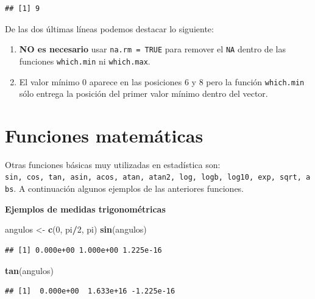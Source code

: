 \documentclass[10pt,]{krantz}
\makeatletter
\newenvironment{Shaded}{\begin{snugshade}}{\end{snugshade}}
\newcommand{\KeywordTok}[1]{\textcolor[rgb]{0.13,0.29,0.53}{\textbf{#1}}}
\newcommand{\DecValTok}[1]{\textcolor[rgb]{0.00,0.00,0.81}{#1}}
\newcommand{\StringTok}[1]{\textcolor[rgb]{0.31,0.60,0.02}{#1}}
\newcommand{\OperatorTok}[1]{\textcolor[rgb]{0.81,0.36,0.00}{\textbf{#1}}}
\newcommand{\NormalTok}[1]{#1}
\providecommand{\tightlist}{%
  \setlength{\itemsep}{0pt}\setlength{\parskip}{0pt}}
\newenvironment{kframe}{%
\medskip{}
\setlength{\fboxsep}{.8em}
 \def\at@end@of@kframe{}%
 \ifinner\ifhmode%
  \def\at@end@of@kframe{\end{minipage}}%
  \begin{minipage}{\columnwidth}%
 \fi\fi%
 \def\FrameCommand##1{\hskip\@totalleftmargin \hskip-\fboxsep
 \colorbox{shadecolor}{##1}\hskip-\fboxsep
     \hskip-\linewidth \hskip-\@totalleftmargin \hskip\columnwidth}%
 \MakeFramed {\advance\hsize-\width
   \@totalleftmargin\z@ \linewidth\hsize
   \@setminipage}}%
 {\par\unskip\endMakeFramed%
 \at@end@of@kframe}
\renewenvironment{Shaded}{\begin{kframe}}{\end{kframe}}
\makeatother
\begin{document}
\begin{verbatim}
## [1] 9
\end{verbatim}

De las dos últimas líneas podemos destacar lo siguiente:

\begin{enumerate}
\def\labelenumi{\arabic{enumi}.}
\tightlist
\item
  \textbf{NO es necesario} usar \texttt{na.rm\ =\ TRUE} para remover el
  \texttt{NA} dentro de las funciones \texttt{which.min} ni
  \texttt{which.max}.
\item
  El valor mínimo 0 aparece en las posiciones 6 y 8 pero la función
  \texttt{which.min} sólo entrega la posición del primer valor mínimo
  dentro del vector.
\end{enumerate}

\section{Funciones matemáticas}\label{funciones-matematicas}

Otras funciones básicas muy utilizadas en estadística son:
\texttt{sin,\ cos,\ tan,\ asin,\ acos,\ atan,\ atan2,\ log,\ logb,\ log10,\ exp,\ sqrt,\ abs}.
A continuación algunos ejemplos de las anteriores funciones.

\textbf{Ejemplos de medidas trigonométricas}

\begin{Shaded}
\begin{Highlighting}[]
\NormalTok{angulos <-}\StringTok{ }\KeywordTok{c}\NormalTok{(}\DecValTok{0}\NormalTok{, pi}\OperatorTok{/}\DecValTok{2}\NormalTok{, pi)}
\KeywordTok{sin}\NormalTok{(angulos)}
\end{Highlighting}
\end{Shaded}

\begin{verbatim}
## [1] 0.000e+00 1.000e+00 1.225e-16
\end{verbatim}

\begin{Shaded}
\begin{Highlighting}[]
\KeywordTok{tan}\NormalTok{(angulos)}
\end{Highlighting}
\end{Shaded}

\begin{verbatim}
## [1]  0.000e+00  1.633e+16 -1.225e-16
\end{verbatim}
\end{document}
